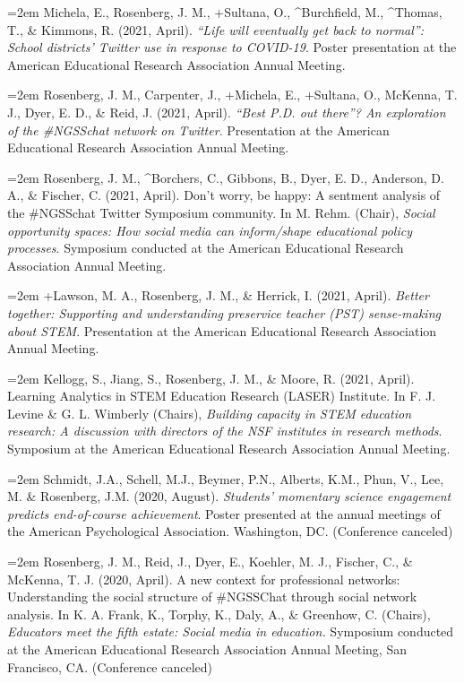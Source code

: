 \documentclass[
  14,
]{article}
\begin{document}
\hangindent=2em Michela, E., Rosenberg, J. M., +Sultana, O.,
\^{}Burchfield, M., \^{}Thomas, T., \& Kimmons, R. (2021, April).
\emph{``Life will eventually get back to normal'': School districts'
Twitter use in response to COVID-19}. Poster presentation at the
American Educational Research Association Annual Meeting.

\hangindent=2em Rosenberg, J. M., Carpenter, J., +Michela, E., +Sultana,
O., McKenna, T. J., Dyer, E. D., \& Reid, J. (2021, April). \emph{``Best
P.D. out there''? An exploration of the \#NGSSchat network on Twitter}.
Presentation at the American Educational Research Association Annual
Meeting.

\hangindent=2em Rosenberg, J. M., \^{}Borchers, C., Gibbons, B., Dyer,
E. D., Anderson, D. A., \& Fischer, C. (2021, April). Don't worry, be
happy: A sentment analysis of the \#NGSSchat Twitter Symposium
community. In M. Rehm. (Chair), \emph{Social opportunity spaces: How
social media can inform/shape educational policy processes}. Symposium
conducted at the American Educational Research Association Annual
Meeting.

\hangindent=2em +Lawson, M. A., Rosenberg, J. M., \& Herrick, I. (2021,
April). \emph{Better together: Supporting and understanding preservice
teacher (PST) sense-making about STEM}. Presentation at the American
Educational Research Association Annual Meeting.

\hangindent=2em Kellogg, S., Jiang, S., Rosenberg, J. M., \& Moore, R.
(2021, April). Learning Analytics in STEM Education Research (LASER)
Institute. In F. J. Levine \& G. L. Wimberly (Chairs), \emph{Building
capacity in STEM education research: A discussion with directors of the
NSF institutes in research methods}. Symposium at the American
Educational Research Association Annual Meeting.

\hangindent=2em Schmidt, J.A., Schell, M.J., Beymer, P.N., Alberts,
K.M., Phun, V., Lee, M. \& Rosenberg, J.M. (2020, August).
\emph{Students' momentary science engagement predicts end-of-course
achievement}. Poster presented at the annual meetings of the American
Psychological Association. Washington, DC. (Conference canceled)

\hangindent=2em Rosenberg, J. M., Reid, J., Dyer, E., Koehler, M. J.,
Fischer, C., \& McKenna, T. J. (2020, April). A new context for
professional networks: Understanding the social structure of \#NGSSChat
through social network analysis. In K. A. Frank, K., Torphy, K., Daly,
A., \& Greenhow, C. (Chairs), \emph{Educators meet the fifth estate:
Social media in education.} Symposium conducted at the American
Educational Research Association Annual Meeting, San Francisco, CA.
(Conference canceled)
\end{document}
